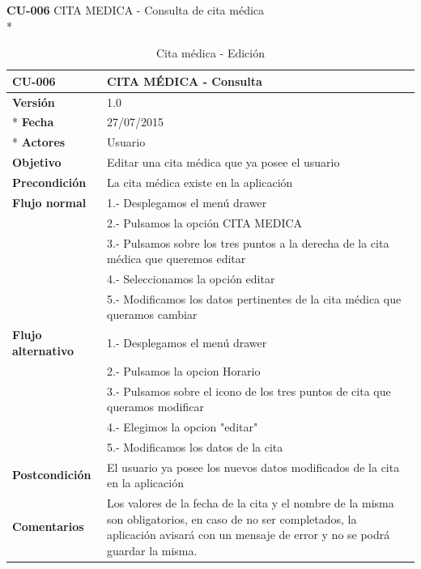 \documentclass[../pfc.tex]{subfiles}
\begin{document}
	\textbf{CU-006}	CITA MEDICA - Consulta de cita médica\\*
	
		\begin{table}[H]
			\centering
			\begin{tabular}[t]{|p{3cm}|p{9.5cm}|}
				\hline \textbf{CU-006} & \textbf{CITA MÉDICA - Consulta} \\*
				\hline\hline \textbf{Versión} & 1.0 \\ *
				\hline\hline \textbf{Fecha} & 27/07/2015 \\ *
				\hline\textbf{Actores} 	& Usuario\\*
				\hline \textbf{Objetivo} & Editar una cita médica que ya posee el usuario\\* 			
				\hline \textbf{Precondición} & La cita médica existe en la aplicación\\* 
				\hline \textbf{Flujo normal} & 1.- Desplegamos el menú drawer \\* 
				& 2.- Pulsamos la opción CITA MEDICA\\*	
				& 3.- Pulsamos sobre los tres puntos a la derecha de la cita médica que queremos editar\\*	
				& 4.- Seleccionamos la opción editar\\*	
				& 5.- Modificamos los datos pertinentes de la cita médica que queramos cambiar\\*	
				\hline \textbf{Flujo alternativo} & 1.- Desplegamos el menú drawer \\* 
				& 2.- Pulsamos la opcion Horario \\*	
				& 3.- Pulsamos sobre el icono de los tres puntos de cita que queramos modificar \\*	
				& 4.- Elegimos la opcion "editar"\\*	
				& 5.- Modificamos los datos de la cita\\*	
				\hline \textbf{Postcondición} & El usuario ya posee los nuevos datos modificados de la cita en la aplicación \\* 
				\hline \textbf{Comentarios}   & Los valores de la fecha de la cita y el nombre de la misma son obligatorios, en caso de no ser completados, la aplicación avisará con un mensaje de error y no se podrá guardar la misma.\\*
				\hline
			\end{tabular}
			\caption{Cita médica - Edición}
			\label{tabla:caso006}
		\end{table}
		
	
	
\end{document}
